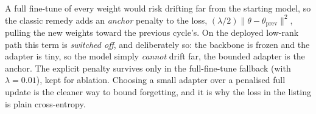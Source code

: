 \begin{pitfall}
A full fine-tune of every weight would risk drifting far from the starting model, so the
classic remedy adds an \emph{anchor} penalty to the loss, $(\lambda/2)\lVert\theta -
\theta_{\text{prev}}\rVert^2$, pulling the new weights toward the previous cycle's. On
the deployed low-rank path this term is \emph{switched off}, and deliberately so: the
backbone is frozen and the adapter is tiny, so the model simply \emph{cannot} drift far,
the bounded adapter is the anchor. The explicit penalty survives only in the
full-fine-tune fallback (with $\lambda = 0.01$), kept for ablation. Choosing a small
adapter over a penalised full update is the cleaner way to bound forgetting, and it is
why the loss in the listing is plain cross-entropy.
\end{pitfall}

